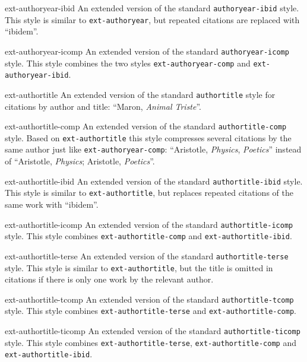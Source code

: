 \documentclass{ltxdockit}
\begin{document}
\begin{marglist}
\item[ext-authoryear-ibid]
An extended version of the standard \texttt{authoryear-ibid} style.
This style is similar to \texttt{ext-authoryear}, but repeated citations are
replaced with \enquote{ibidem}.

\item[ext-authoryear-icomp]
An extended version of the standard \texttt{authoryear-icomp} style.
This style combines the two styles \texttt{ext-authoryear-comp} and
\texttt{ext-authoryear-ibid}.

\item[ext-authortitle]
An extended version of the standard \texttt{authortitle} style for citations
by author and title: \enquote{Maron, \emph{Animal Triste}}.

\item[ext-authortitle-comp]
An extended version of the standard \texttt{authortitle-comp} style.
Based on \texttt{ext-authortitle} this style compresses several citations
by the same author just like \texttt{ext-authoryear-comp}:
\enquote{Aristotle, \emph{Physics}, \emph{Poetics}} instead of
\enquote{Aristotle, \emph{Physics}; Aristotle, \emph{Poetics}}.

\item[ext-authortitle-ibid]
An extended version of the standard \texttt{authortitle-ibid} style.
This style is similar to \texttt{ext-authortitle}, but replaces repeated
citations of the same work with \enquote{ibidem}.

\item[ext-authortitle-icomp]
An extended version of the standard \texttt{authortitle-icomp} style.
This style combines \texttt{ext-authortitle-comp} and
\texttt{ext-authortitle-ibid}.

\item[ext-authortitle-terse]
An extended version of the standard \texttt{authortitle-terse} style.
This style is similar to \texttt{ext-authortitle}, but the title is omitted in
citations if there is only one work by the relevant author.

\item[ext-authortitle-tcomp]
An extended version of the standard \texttt{authortitle-tcomp} style.
This style combines \texttt{ext-authortitle-terse} and
\texttt{ext-authortitle-comp}.

\item[ext-authortitle-ticomp]
An extended version of the standard \texttt{authortitle-ticomp} style.
This style combines \texttt{ext-authortitle-terse},
\texttt{ext-authortitle-comp} and \texttt{ext-authortitle-ibid}.



\end{marglist}
\end{document}
